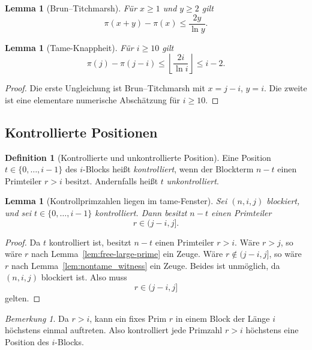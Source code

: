 \documentclass[12pt,a4paper]{article}
\theoremstyle{plain}
\newtheorem{lemma}[theorem]{Lemma}
\theoremstyle{definition}
\newtheorem{definition}[theorem]{Definition}
\theoremstyle{remark}
\newtheorem{remark}[theorem]{Bemerkung}
\begin{document}
	\begin{lemma}[Brun--Titchmarsh]
		Für \(x\ge1\) und \(y\ge2\) gilt
		\[
		\pi(x+y)-\pi(x)\le \frac{2y}{\ln y}.
		\]
	\end{lemma}
	
	\begin{lemma}[Tame-Knappheit]
		\label{lem:tame-scarcity}
		Für \(i\ge10\) gilt
		\[
		\pi(j)-\pi(j-i)\le \left\lfloor \frac{2i}{\ln i}\right\rfloor \le i-2.
		\]
	\end{lemma}
	
	\begin{proof}
		Die erste Ungleichung ist Brun--Titchmarsh mit \(x=j-i\), \(y=i\). Die zweite ist eine elementare numerische Abschätzung für \(i\ge10\).
	\end{proof}
	
	\subsection{Kontrollierte Positionen}
	
	\begin{definition}[Kontrollierte und unkontrollierte Position]
		\label{def:controlled_positions}
		Eine Position \(t\in\{0,\dots,i-1\}\) des \(i\)-Blocks heißt \emph{kontrolliert},
		wenn der Blockterm \(n-t\) einen Primteiler \(r>i\) besitzt.
		Andernfalls heißt \(t\) \emph{unkontrolliert}.
	\end{definition}
	
	\begin{lemma}[Kontrollprimzahlen liegen im tame-Fenster]
		\label{lem:controlled_tame}
		Sei \((n,i,j)\) blockiert, und sei \(t\in\{0,\dots,i-1\}\) kontrolliert.
		Dann besitzt \(n-t\) einen Primteiler
		\[
		r\in(j-i,j].
		\]
	\end{lemma}
	
	\begin{proof}
		Da \(t\) kontrolliert ist, besitzt \(n-t\) einen Primteiler \(r>i\).
		Wäre \(r>j\), so wäre \(r\) nach Lemma~\ref{lem:free-large-prime} ein Zeuge.
		Wäre \(r\notin(j-i,j]\), so wäre \(r\) nach Lemma~\ref{lem:nontame_witness} ein Zeuge.
		Beides ist unmöglich, da \((n,i,j)\) blockiert ist. Also muss
		\[
		r\in(j-i,j]
		\]
		gelten.
	\end{proof}
	
	\begin{remark}
		Da \(r>i\), kann ein fixes Prim \(r\) in einem Block der Länge \(i\) höchstens einmal
		auftreten. Also kontrolliert jede Primzahl \(r>i\) höchstens eine Position des \(i\)-Blocks.
	\end{remark}
	
\end{document}
